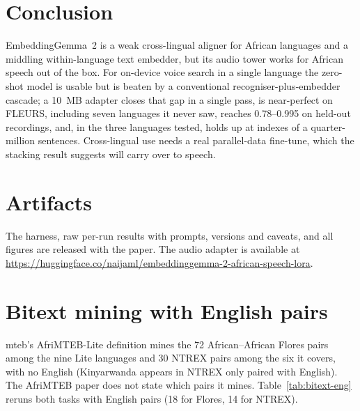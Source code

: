 \documentclass[conference]{IEEEtran}
\newcommand{\egtwo}{EmbeddingGemma~2}
\begin{document}
\section{Conclusion}

\egtwo{} is a weak cross-lingual aligner for African languages and a middling within-language text embedder, but its audio tower works for African speech out of the box. For on-device voice search in a single language the zero-shot model
is usable but is beaten by a conventional recogniser-plus-embedder cascade; a
10~MB adapter closes that gap in a single pass, is near-perfect on FLEURS, including seven languages it never saw, reaches 0.78--0.995 on held-out recordings, and, in the three languages tested, holds up at indexes of a quarter-million sentences. Cross-lingual use needs a real parallel-data fine-tune, which the stacking result suggests will carry over to speech.

\section*{Artifacts}

The harness, raw per-run results with prompts, versions and caveats, and all
figures are released with the paper. The audio adapter is available at
\url{https://huggingface.co/naijaml/embeddinggemma-2-african-speech-lora}.

\appendices

\section{Bitext mining with English pairs}
\label{app:bitext}

mteb's AfriMTEB-Lite definition mines the 72 African--African Flores pairs among the nine Lite languages and 30 NTREX pairs among the six it covers, with no English (Kinyarwanda appears in NTREX only paired with English). The AfriMTEB
paper does not state which pairs it mines. Table~\ref{tab:bitext-eng} reruns
both tasks with English pairs (18 for Flores, 14 for NTREX).
\end{document}

